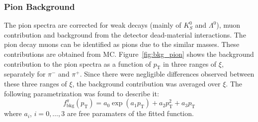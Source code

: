 \subsubsection{Pion Background}\label{section:star_background_pion}
The pion spectra are corrected for weak decays (mainly of $K^0_S$ and $\Lambda^0$), muon contribution and background from the   detector dead-material interactions. The pion decay muons can be identified as pions due to the similar masses. These contributions are obtained from MC. Figure~\ref{fig:bkg_pion} shows the background contribution to the pion spectra as a function of $p_\textrm{T}$ in three ranges of $\xi$, separately for $\pi^-$ and $\pi^+$.  Since there were   negligible differences  observed between these  three ranges of $\xi$, the background contribution was averaged over $\xi$. The following parametrization was found to describe it:
\begin{equation}
f_{\textrm{bkg}}^{\pi}\left(p_\textrm{T}\right)=a_0\exp(a_1p_\textrm{T})+a_2p_\textrm{T}^2+a_3p_\textrm{T}
\end{equation}
where $a_i$, $i=0,\dots, 3$ are free paramaters of the fitted function.

